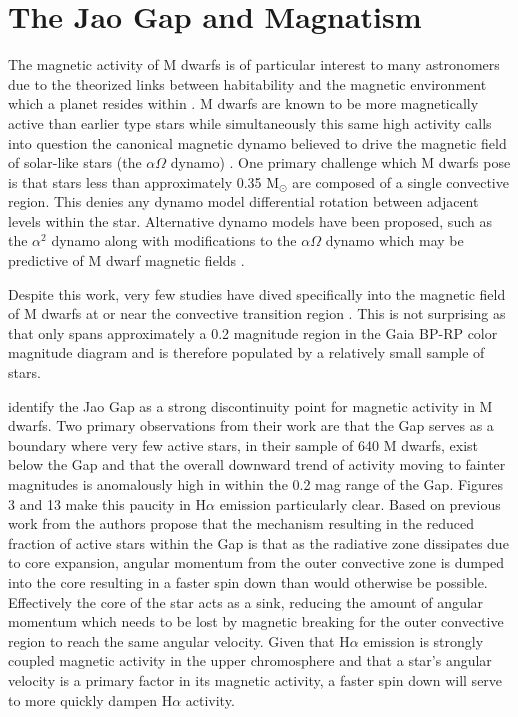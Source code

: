 \section{The Jao Gap and Magnatism}\label{sec:intro}
The magnetic activity of M dwarfs is of particular interest to many astronomers
due to the theorized links between habitability and the magnetic environment
which a planet resides within \citep[e.g.][]{Lammer2012,Gallet2017,
Kislyakova2017}. M dwarfs are known to be more magnetically active than earlier
type stars \citep{Saar1985,Astudillo-Defru2017,Wright2018} while simultaneously
this same high activity calls into question the canonical magnetic dynamo
believed to drive the magnetic field of solar-like stars (the $\alpha\Omega$
dynamo) \citep{Shulyak2015}. One primary challenge which M dwarfs pose is that
stars less than approximately 0.35 M$_{\odot}$ are composed of a single
convective region. This denies any dynamo model differential rotation between
adjacent levels within the star. Alternative dynamo models have been proposed,
such as the $\alpha^{2}$ dynamo along with modifications to the $\alpha\Omega$
dynamo which may be predictive of M dwarf magnetic fields \citep{Chabrier2006,
Kochukhov2021, Kleeorin2023}.

Despite this work, very few studies have dived specifically into the magnetic
field of M dwarfs at or near the convective transition region . This is not
surprising as that only spans approximately a 0.2 magnitude region
in the Gaia BP-RP color magnitude diagram and is therefore populated by a
relatively small sample of stars. 

\citet{Jao2023} identify the Jao Gap as a strong discontinuity point for
magnetic activity in M dwarfs. Two primary observations from their work are
that the Gap serves as a boundary where very few active stars, in their sample
of 640 M dwarfs, exist below the Gap and that the overall downward trend of
activity moving to fainter magnitudes is anomalously high in within the 0.2 mag
range of the Gap. \citeauthor{Jao2023} Figures 3 and 13 make this paucity in
H$\alpha$ emission particularly clear. Based on previous work from
\citet{Spada2020, Curtis2020, Dungee2022} the authors propose that the
mechanism resulting in the reduced fraction of active stars within the Gap is
that as the radiative zone dissipates due to core expansion, angular momentum
from the outer convective zone is dumped into the core resulting in a faster
spin down than would otherwise be possible. Effectively the core of the star
acts as a sink, reducing the amount of angular momentum which needs to be lost
by magnetic breaking for the outer convective region to reach the same angular
velocity. Given that H$\alpha$ emission is strongly coupled magnetic activity
in the upper chromosphere \citep{Newton2016, Kumar2023} and that a star's angular velocity
is a primary factor in its magnetic activity, a faster spin down will serve to
more quickly dampen H$\alpha$ activity.

